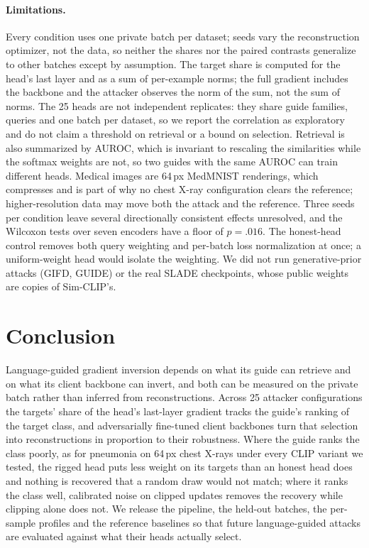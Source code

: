 \paragraph{Limitations.}
Every condition uses one private batch per dataset; seeds vary the reconstruction optimizer, not the data, so neither the shares nor the paired contrasts generalize to other batches except by assumption.
The target share is computed for the head's last layer and as a sum of per-example norms; the full gradient includes the backbone and the attacker observes the norm of the sum, not the sum of norms.
The 25 heads are not independent replicates: they share guide families, queries and one batch per dataset, so we report the correlation as exploratory and do not claim a threshold on retrieval or a bound on selection.
Retrieval is also summarized by AUROC, which is invariant to rescaling the similarities while the softmax weights are not, so two guides with the same AUROC can train different heads.
Medical images are 64\,px MedMNIST renderings, which compresses \lpips and is part of why no chest X-ray configuration clears the reference; higher-resolution data may move both the attack and the reference.
Three seeds per condition leave several directionally consistent effects unresolved, and the Wilcoxon tests over seven encoders have a floor of $p=.016$.
The honest-head control removes both query weighting and per-batch loss normalization at once; a uniform-weight head would isolate the weighting.
We did not run generative-prior attacks (GIFD, GUIDE) or the real SLADE checkpoints, whose public weights are copies of Sim-CLIP's.

\section{Conclusion}
\label{sec:conclusion}
Language-guided gradient inversion depends on what its guide can retrieve and on what its client backbone can invert, and both can be measured on the private batch rather than inferred from reconstructions.
Across 25 attacker configurations the targets' share of the head's last-layer gradient tracks the guide's ranking of the target class, and adversarially fine-tuned client backbones turn that selection into reconstructions in proportion to their robustness.
Where the guide ranks the class poorly, as for pneumonia on 64\,px chest X-rays under every CLIP variant we tested, the rigged head puts less weight on its targets than an honest head does and nothing is recovered that a random draw would not match; where it ranks the class well, calibrated noise on clipped updates removes the recovery while clipping alone does not.
We release the pipeline, the held-out batches, the per-sample profiles and the reference baselines so that future language-guided attacks are evaluated against what their heads actually select.
